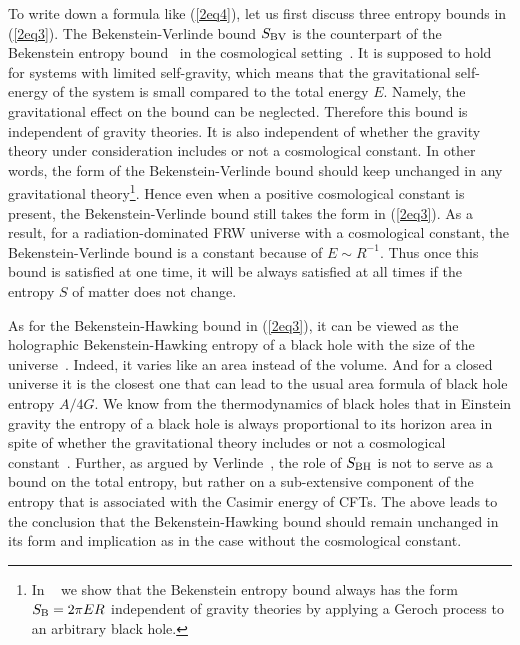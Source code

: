 \documentclass[a4paper,12pt]{article}
\begin{document}
To write down a formula like (\ref{2eq4}), let us first
discuss three entropy bounds in (\ref{2eq3}). The
Bekenstein-Verlinde bound $S_{\rm BV}$ is the counterpart of the
Bekenstein entropy bound~\cite{Beke} in the cosmological
setting~\cite{CMO}. It is supposed to hold for systems with
limited self-gravity, which means that the gravitational
self-energy of the system is small compared to the total energy
$E$. Namely, the gravitational effect on the bound can be
neglected. Therefore this bound is independent of gravity
theories. It is also independent of
whether the gravity theory under consideration includes or not a 
cosmological constant. In other words, the form of the Bekenstein-Verlinde
bound should keep unchanged in any gravitational theory\footnote{
In ~\cite{CM} we show that the Bekenstein entropy bound always
has the form $S_{\rm B}=2\pi E R$ independent of gravity
theories by applying a Geroch process to an arbitrary black hole.}. 
Hence even when a positive cosmological constant is present, the
Bekenstein-Verlinde bound still takes the form in
(\ref{2eq3}). As a result, for a radiation-dominated FRW universe with a
cosmological constant, the Bekenstein-Verlinde bound is a constant 
because of $E\sim R^{-1}$. Thus once this bound is satisfied at one time,
 it will be always satisfied at all times if the entropy
 $S$ of matter does not change.

 As for the Bekenstein-Hawking bound in (\ref{2eq3}), it can be
 viewed as the holographic Bekenstein-Hawking entropy of a black
 hole with the size of the universe~\cite{Verl}. Indeed, it varies
 like an area instead of the volume. And for a closed universe it
 is the closest one that can lead to the usual area formula of black
 hole entropy $A/4G$. We know from the thermodynamics of black
 holes that in Einstein gravity  the entropy of a black hole
 is always proportional to its horizon area in spite of whether the
 gravitational theory includes or not a cosmological
 constant~\cite{TM}. Further, as argued by Verlinde~\cite{Verl},
 the role of $S_{\rm BH}$ is not to serve as a bound on the total
 entropy, but rather on a sub-extensive component of the entropy
 that is associated with the Casimir energy of CFTs. The above
 leads to the conclusion that the Bekenstein-Hawking bound should
 remain unchanged in its form and implication as in the case without
 the cosmological constant.
\end{document}
